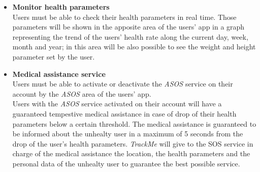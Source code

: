 \begin {itemize}
	\item {\textbf{Monitor health parameters}\\ Users must be able to check their health parameters in real time. Those parameters will be shown in the apposite area of the users' app in a graph representing the trend of the users' health rate along the current day, week, month and year; in this area will be also possible to see the weight and height parameter set by the user. }

	\item {\textbf{Medical assistance service}\\ Users must be able to activate or deactivate the \textit{ASOS} service on their account by the \textit{ASOS} area of the users' app. \\ Users with the \textit{ASOS} service activated on their account will have a guaranteed tempestive medical assistance in case of drop of their health parameters below a certain threshold. The medical assistance is guaranteed to be informed about the unhealty user in a maximum of 5 seconds from the drop of the user's health parameters. \textit{TrackMe} will give to the SOS service in charge of the medical assistance the location, the health parameters and the personal data of the unhealty user to guarantee the best possible service.}
		

\end {itemize}